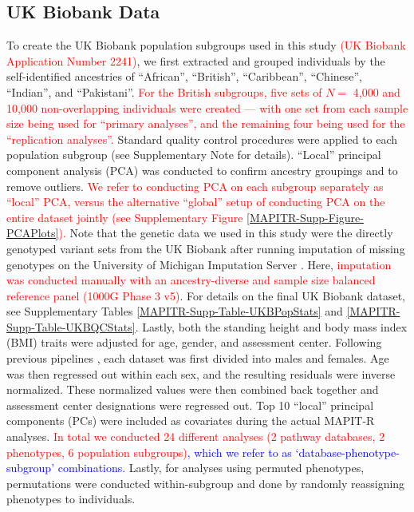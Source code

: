 \documentclass[10pt]{article}
\begin{document}
\subsection*{UK Biobank Data} 

To create the UK Biobank population subgroups used in this study \textcolor{red}{(UK Biobank Application Number 2241)}, we first extracted and grouped individuals by the self-identified ancestries of ``African'', ``British'', ``Caribbean'', ``Chinese'', ``Indian'', and ``Pakistani''. \textcolor{red}{For the British subgroups, five sets of $N =$ 4,000 and 10,000 non-overlapping individuals were created --- with one set from each sample size being used for ``primary analyses'', and the remaining four being used for the ``replication analyses''.} Standard quality control procedures were applied to each population subgroup (see Supplementary Note for details). ``Local'' principal component analysis (PCA) was conducted to confirm ancestry groupings and to remove outliers. \textcolor{red}{We refer to conducting PCA on each subgroup separately as ``local'' PCA, versus the alternative ``global'' setup of conducting PCA on the entire dataset jointly (see Supplementary Figure \ref{MAPITR-Supp-Figure-PCAPlots}).} Note that the genetic data we used in this study were the directly genotyped variant sets from the UK Biobank after running imputation of missing genotypes on the University of Michigan Imputation Server \cite{Das2016}. Here, \textcolor{red}{imputation was conducted manually with an ancestry-diverse and sample size balanced reference panel (1000G Phase 3 v5)}. For details on the final UK Biobank dataset, see Supplementary Tables \ref{MAPITR-Supp-Table-UKBPopStats} and \ref{MAPITR-Supp-Table-UKBQCStats}. Lastly, both the standing height and body mass index (BMI) traits were adjusted for age, gender, and assessment center. Following previous pipelines \cite{Wood2014a,Locke2015}, each dataset was first divided into males and females. Age was then regressed out within each sex, and the resulting residuals were inverse normalized. These normalized values were then combined back together and assessment center designations were regressed out. Top 10 ``local'' principal components (PCs) were included as covariates during the actual MAPIT-R analyses. \textcolor{red}{In total we conducted 24 different analyses (2 pathway databases, 2 phenotypes, 6 population subgroups)}\textcolor{blue}{, which we refer to as `database-phenotype-subgroup' combinations.} Lastly, for analyses using permuted phenotypes, permutations were conducted within-subgroup and done by randomly reassigning phenotypes to individuals.
\end{document}
